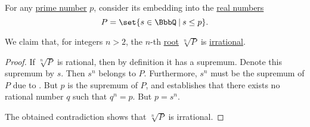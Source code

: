 \begin{proposition}\label{thm:nth_root_is_irrational}
  For any \hyperref[def:prime_number]{prime number} \( p \), consider its embedding into the \hyperref[def:real_numbers]{real numbers}
  \begin{equation*}
    P = \set{ s \in \BbbQ \given s \leq p }.
  \end{equation*}

  We claim that, for integers \( n > 2 \), the \( n \)-th \hyperref[def:nth_root]{root} \( \sqrt[n]{ P } \) is \hyperref[def:irrational_numbers]{irrational}.
\end{proposition}
\begin{proof}
   If \( \sqrt[n]{ P } \) is rational, then by definition it has a supremum. Denote this supremum by \( s \). Then \( s^n \) belongs to \( P \). Furthermore, \( s^n \) must be the supremum of \( P \) due to . But \( p \) is the supremum of \( P \), and  establishes that there exists no rational number \( q \) such that \( q^n = p \). But \( p = s^n \).

   The obtained contradiction shows that \( \sqrt[n]{ P } \) is irrational.
\end{proof}

